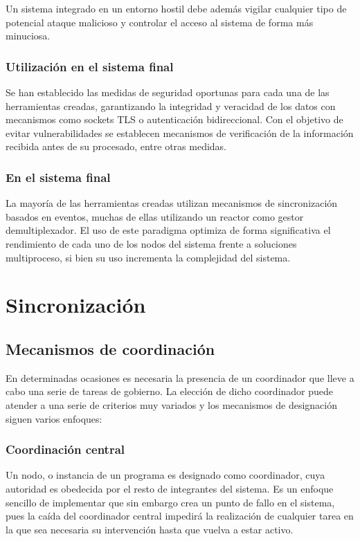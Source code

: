 Un sistema integrado en un entorno hostil debe además vigilar cualquier tipo de potencial ataque malicioso y controlar el acceso al sistema de forma más minuciosa.

\subsubsection{Utilización en el sistema final}

Se han establecido las medidas de seguridad oportunas para cada una de las herramientas creadas, garantizando la integridad y veracidad de los datos con mecanismos como sockets TLS o autenticación bidireccional. Con el objetivo de evitar vulnerabilidades se establecen mecanismos de verificación de la información recibida antes de su procesado, entre otras medidas.

\subsubsection{En el sistema final}

La mayoría de las herramientas creadas utilizan mecanismos de sincronización basados en eventos, muchas de ellas utilizando un reactor como gestor demultiplexador. El uso de este paradigma optimiza de forma significativa el rendimiento de cada uno de los nodos del sistema frente a soluciones multiproceso, si bien su uso incrementa la complejidad del sistema.

\section{Sincronización}

\subsection{Mecanismos de coordinación}

En determinadas ocasiones es necesaria la presencia de un coordinador que lleve a cabo una serie de tareas de gobierno. La elección de dicho coordinador puede atender a una serie de criterios muy variados y los mecanismos de designación siguen varios enfoques:

\subsubsection{Coordinación central}

Un nodo, o instancia de un programa es designado como coordinador, cuya autoridad es obedecida por el resto de integrantes del sistema. Es un enfoque sencillo de implementar que sin embargo crea un punto de fallo en el sistema, pues la caída del coordinador central impedirá la realización de cualquier tarea en la que sea necesaria su intervención hasta que vuelva a estar activo.

